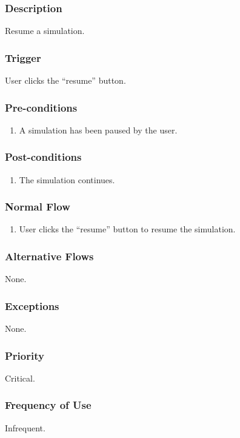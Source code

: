 \documentclass[a4paper,11pt,titlepage]{article}
\begin{document}
\subsubsection{Description}
Resume a simulation.
\subsubsection{Trigger}
User clicks the ``resume'' button.
\subsubsection{Pre-conditions}

\begin{enumerate}
  \item A simulation has been paused by the user.
\end{enumerate}

\subsubsection{Post-conditions}

\begin{enumerate}
  \item The simulation continues.
\end{enumerate}

\subsubsection{Normal Flow}
\begin{enumerate}
  \item User clicks the ``resume'' button to resume the simulation.
\end{enumerate}

\subsubsection{Alternative Flows}
None.

\subsubsection{Exceptions}
None.

\subsubsection{Priority}
Critical.

\subsubsection{Frequency of Use}
Infrequent.
\end{document}
